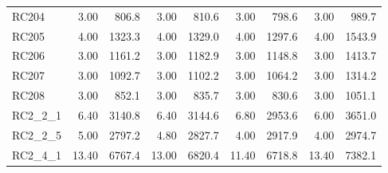 \documentclass{article}
\begin{document}
{\begin{longtable}{l r r r r r r r r }
RC204 & 3.00 & 806.8 & 3.00 & 810.6 & 3.00 & 798.6 & 3.00 & 989.7 \\
RC205 & 4.00 & 1323.3 & 4.00 & 1329.0 & 4.00 & 1297.6 & 4.00 & 1543.9 \\
RC206 & 3.00 & 1161.2 & 3.00 & 1182.9 & 3.00 & 1148.8 & 3.00 & 1413.7 \\
RC207 & 3.00 & 1092.7 & 3.00 & 1102.2 & 3.00 & 1064.2 & 3.00 & 1314.2 \\
RC208 & 3.00 & 852.1 & 3.00 & 835.7 & 3.00 & 830.6 & 3.00 & 1051.1 \\
RC2\_2\_1 & 6.40 & 3140.8 & 6.40 & 3144.6 & 6.80 & 2953.6 & 6.00 & 3651.0 \\
RC2\_2\_5 & 5.00 & 2797.2 & 4.80 & 2827.7 & 4.00 & 2917.9 & 4.00 & 2974.7 \\
RC2\_4\_1 & 13.40 & 6767.4 & 13.00 & 6820.4 & 11.40 & 6718.8 & 13.40 & 7382.1 \\
\bottomrule
\end{longtable}

}
\end{document}
